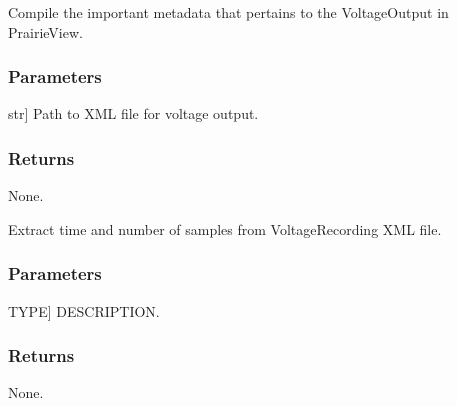 \documentclass[letterpaper,10pt,english]{sphinxmanual}
\begin{document}
\begin{fulllineitems}
\label{\detokenize{CalSciPy.bruker.xml_load:CalSciPy.bruker.xml_load.get_voltage_output}}
\pysigstartsignatures
{}
\pysigstopsignatures
\sphinxAtStartPar
Compile the important metadata that pertains to the VoltageOutput in PrairieView.


\subsubsection{Parameters}
\label{\detokenize{CalSciPy.bruker.xml_load:parameters}}\begin{description}
\sphinxlineitem{xml\_file}{[}str{]}
\sphinxAtStartPar
Path to XML file for voltage output.

\end{description}


\subsubsection{Returns}
\label{\detokenize{CalSciPy.bruker.xml_load:returns}}
\sphinxAtStartPar
None.

\end{fulllineitems}


\begin{fulllineitems}
\label{\detokenize{CalSciPy.bruker.xml_load:CalSciPy.bruker.xml_load.get_voltage_recording}}
\pysigstartsignatures
{}
\pysigstopsignatures
\sphinxAtStartPar
Extract time and number of samples from VoltageRecording XML file.


\subsubsection{Parameters}
\label{\detokenize{CalSciPy.bruker.xml_load:id1}}\begin{description}
\sphinxlineitem{xml\_file}{[}TYPE{]}
\sphinxAtStartPar
DESCRIPTION.

\end{description}


\subsubsection{Returns}
\label{\detokenize{CalSciPy.bruker.xml_load:id2}}
\sphinxAtStartPar
None.

\end{fulllineitems}
\end{document}
